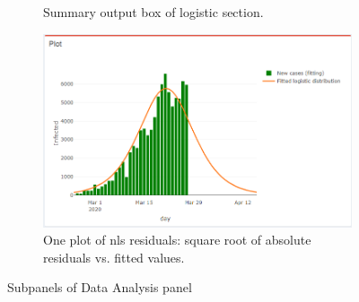 \documentclass[
12pt, %
a4paper, %
oneside, %
headinclude,footinclude, %
BCOR5mm, %
]{scrartcl}
\begin{document}
\begin{figure}[H]
\begin{subfigure}{0.6\textwidth}
  \caption{Summary output box of logistic section.}
  \label{fig:logistic_plot1}
\end{subfigure} 
\hspace{5.5cm}
\begin{subfigure}{0.6\textwidth}
  \includegraphics[width=1\linewidth]{Figures/logistic_plot2.png} 
  \caption{One plot of nls residuals: square root of absolute residuals vs. fitted values.}
  \label{fig:logistic_plot2}
\end{subfigure}
\caption{Subpanels of Data Analysis panel }
\label{fig:logistic_plots_set}
\end{figure}
\end{document}

